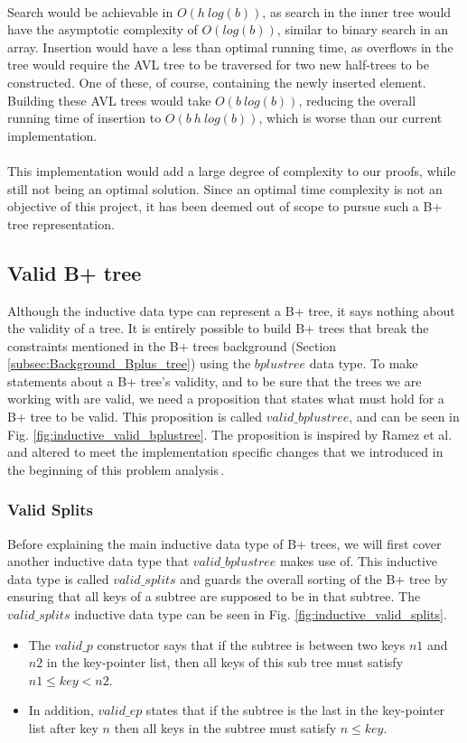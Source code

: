 \paragraph{}
Search would be achievable in $O(h~log(b))$, as search in the inner tree would have the asymptotic complexity of $O(log(b))$, similar to binary search in an array. Insertion would have a less than optimal running time, as overflows in the tree would require the AVL tree to be traversed for two new half-trees to be constructed. One of these, of course, containing the newly inserted element. Building these AVL trees would take $O(b~log(b))$, reducing the overall running time of insertion to $O(b~h~log(b))$, which is worse than our current implementation.
\paragraph{}
This implementation would add a large degree of complexity to our proofs, while still not being an optimal solution. Since an optimal time complexity is not an objective of this project, it has been deemed out of scope to pursue such a B+ tree representation.


\subsection{Valid B+ tree}
\label{subsec:Valid_bplustree}
Although the inductive data type can represent a B+ tree, it says nothing about the validity of a tree. It is entirely possible to build B+ trees that break the constraints mentioned in the B+ trees background (Section \ref{subsec:Background_Bplus_tree}) using the $bplustree$ data type. To make statements about a B+ tree's validity, and to be sure that the trees we are working with are valid, we need a proposition that states what must hold for a B+ tree to be valid. This proposition is called $valid\_bplustree$, and can be seen in Fig. \ref{fig:inductive_valid_bplustree}. The proposition is inspired by Ramez et al. and altered to meet the implementation specific changes that we introduced in the beginning of this problem analysis\,\cite[pp. 652]{Elmasri1999}. 
\subsubsection{Valid Splits}
Before explaining the main inductive data type of B+ trees, we will first cover another inductive data type that $valid\_bplustree$ makes use of. This inductive data type is called $valid\_splits$ and guards the overall sorting of the B+ tree by ensuring that all keys of a subtree are supposed to be in that subtree. The $valid\_splits$ inductive data type can be seen in Fig. \ref{fig:inductive_valid_splits}.
\begin{itemize}
	\item The $valid\_p$ constructor says that if the subtree is between two keys $n1$ and $n2$ in the key-pointer list, then all keys of this sub tree must satisfy $n1 \leq key < n2$. 
	\item In addition, $valid\_ep$ states that if the subtree is the last in the key-pointer list after key $n$ then all keys in the subtree must satisfy $n \leq key$.
\end{itemize} 


